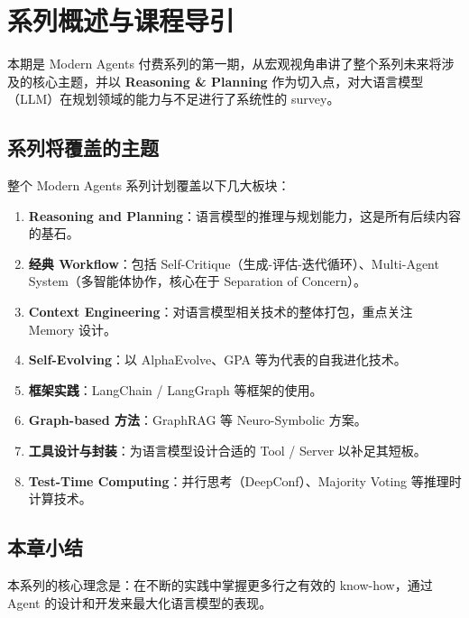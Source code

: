 \section{系列概述与课程导引}

本期是 Modern Agents 付费系列的第一期，从宏观视角串讲了整个系列未来将涉及的核心主题，并以 \textbf{Reasoning \& Planning} 作为切入点，对大语言模型（LLM）在规划领域的能力与不足进行了系统性的 survey。

\subsection{系列将覆盖的主题}

整个 Modern Agents 系列计划覆盖以下几大板块：

\begin{enumerate}
    \item \textbf{Reasoning and Planning}：语言模型的推理与规划能力，这是所有后续内容的基石。
    \item \textbf{经典 Workflow}：包括 Self-Critique（生成-评估-迭代循环）、Multi-Agent System（多智能体协作，核心在于 Separation of Concern）。
    \item \textbf{Context Engineering}：对语言模型相关技术的整体打包，重点关注 Memory 设计。
    \item \textbf{Self-Evolving}：以 AlphaEvolve、GPA 等为代表的自我进化技术。
    \item \textbf{框架实践}：LangChain / LangGraph 等框架的使用。
    \item \textbf{Graph-based 方法}：GraphRAG 等 Neuro-Symbolic 方案。
    \item \textbf{工具设计与封装}：为语言模型设计合适的 Tool / Server 以补足其短板。
    \item \textbf{Test-Time Computing}：并行思考（DeepConf）、Majority Voting 等推理时计算技术。
\end{enumerate}

\subsection{本章小结}

本系列的核心理念是：在不断的实践中掌握更多行之有效的 know-how，通过 Agent 的设计和开发来最大化语言模型的表现。


